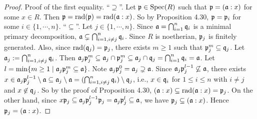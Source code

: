 \begin{proof}
    Proof of the first equality. ``$\supseteq$''. Let $\mathfrak{p} \in \operatorname{Spec}(R)$ such that $\mathfrak{p} = (\mathfrak{a}:x)$ for some $x \in R$. Then $\mathfrak{p} = \operatorname{rad}(\mathfrak{p}) = \operatorname{rad}(\mathfrak{a}:x)$. So by Proposition 4.30, $\mathfrak{p} = \mathfrak{p}_i$ for some $i \in \{1,\cdots,n\}$. ``$\subseteq$''. Let $j \in \{1,\cdots,n\}$. Since $\mathfrak{a} = \bigcap_{i=1}^{n}\mathfrak{q}_i$ is a minimal primary decomposition, $\mathfrak{a} \subsetneq \bigcap_{i=1, i \neq j}^{n} \mathfrak{q}_i$. Since $R$ is noetherian, $\mathfrak{p}_j$ is finitely generated. Also, since $\operatorname{rad}(\mathfrak{q}_j) = \mathfrak{p}_j$, there exists $m \geq 1$ such that $\mathfrak{p}_j^{m} \subseteq \mathfrak{q}_j$. Let $\mathfrak{a}_j := \bigcap_{i=1,i \neq j}^{n} \mathfrak{q}_i$. Then $\mathfrak{a}_j \mathfrak{p}_j^{m} \subseteq \mathfrak{a}_j \cap \mathfrak{p}_j^{m} \subseteq \mathfrak{a}_j \cap \mathfrak{q}_j = \bigcap_{i=1}^{n} \mathfrak{q}_i = \mathfrak{a}$. Let $l = \min\{m \geq 1 \mid \mathfrak{a}_j \mathfrak{p}_j^{m} \subseteq \mathfrak{a}\}$. Note $\mathfrak{a}_j \mathfrak{p}_j^{0} = \mathfrak{a}_j \supsetneq \mathfrak{a}$. Since $\mathfrak{a}_j \mathfrak{p}_j^{l-1} \not \subseteq \mathfrak{a}$, there exists $x \in \mathfrak{a}_j \mathfrak{p}_j^{l-1} \setminus \mathfrak{a} \subseteq \mathfrak{a}_j \setminus \mathfrak{a} = (\bigcap_{i=1,i \neq j}^{n} \mathfrak{q}_i) \setminus \mathfrak{q}_j $, i.e., $x \in \mathfrak{q}_i$ for $1 \leq i \leq n$ with $i \neq j$ and $x \not \in \mathfrak{q}_j$. So by the proof of Proposition 4.30, $(\mathfrak{a}:x) \subseteq \operatorname{rad}(\mathfrak{a}:x) = \mathfrak{p}_j$. On the other hand, since $x\mathfrak{p}_j \subseteq \mathfrak{a}_j\mathfrak{p}_j^{l-1}\mathfrak{p}_j = \mathfrak{a}_j \mathfrak{p}_j^{l} \subseteq \mathfrak{a}$, we have $\mathfrak{p}_j \subseteq (\mathfrak{a}:x)$. Hence $\mathfrak{p}_j = (\mathfrak{a}:x)$.
\end{proof}

